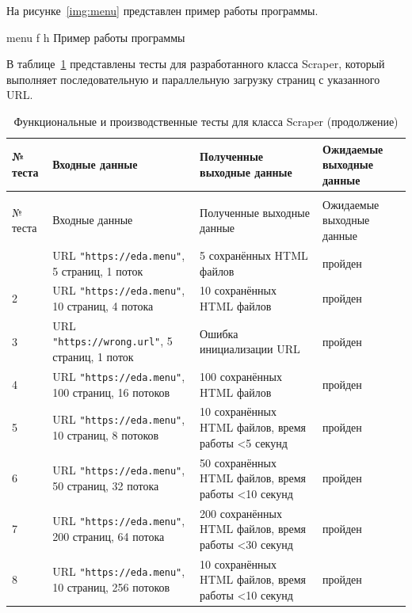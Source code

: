 
На рисунке~\ref{img:menu} представлен пример работы программы.

\FloatBarrier
{}
{menu} %
{f} %
{h} %
{\textwidth} %
{Пример работы программы} %
\FloatBarrier

В таблице~\ref{tbl:tests} представлены тесты для разработанного класса Scraper, который выполняет последовательную и параллельную загрузку страниц с указанного URL.

\begin{longtable}{|p{}|p{}|p{}|p{}|}
    \caption{Функциональные и производственные тесты для класса Scraper}\label{tbl:tests} \\\hline
    № теста & Входные данные & Полученные выходные данные & Ожидаемые выходные данные                                          \\\hline
    \endfirsthead
    \caption{Функциональные и производственные тесты для класса Scraper (продолжение)} \\\hline
    № теста & Входные данные & Полученные выходные данные  & Ожидаемые выходные данные                                                 \\\hline
    \endhead
    \endfoot
    1                                           & URL \texttt{"https://eda.menu"}, 5 страниц, 1 поток & 5 сохранённых HTML файлов & пройден \\\hline
    2                                           & URL \texttt{"https://eda.menu"}, 10 страниц, 4 потока & 10 сохранённых HTML файлов & пройден \\\hline
    3                                           & URL \texttt{"https://wrong.url"}, 5 страниц, 1 поток & Ошибка инициализации URL & пройден \\\hline
    4                                           & URL \texttt{"https://eda.menu"}, 100 страниц, 16 потоков & 100 сохранённых HTML файлов & пройден \\\hline
    5                                           & URL \texttt{"https://eda.menu"}, 10 страниц, 8 потоков & 10 сохранённых HTML файлов, время работы \textless 5 секунд & пройден \\\hline
    6                                           & URL \texttt{"https://eda.menu"}, 50 страниц, 32 потока & 50 сохранённых HTML файлов, время работы \textless 10 секунд & пройден \\\hline
    7                                           & URL \texttt{"https://eda.menu"}, 200 страниц, 64 потока & 200 сохранённых HTML файлов, время работы \textless 30 секунд & пройден \\\hline
    8                                           & URL \texttt{"https://eda.menu"}, 10 страниц, 256 потоков & 10 сохранённых HTML файлов, время работы \textless 10 секунд & пройден \\\hline
\end{longtable}
